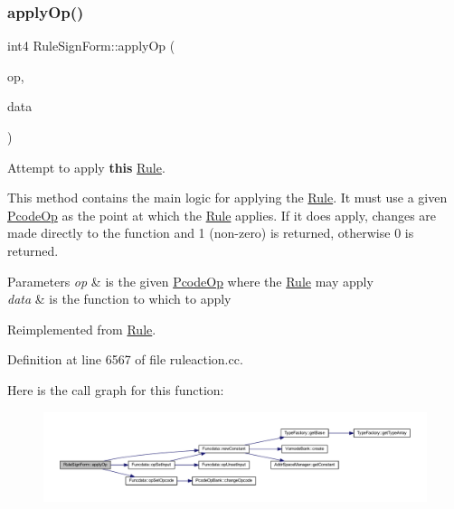 \subsubsection{\texorpdfstring{applyOp()}{applyOp()}}
{\footnotesize\ttfamily int4 Rule\+Sign\+Form\+::apply\+Op (\begin{DoxyParamCaption}\item[{\mbox{\hyperlink{class_pcode_op}{Pcode\+Op}} $\ast$}]{op,  }\item[{\mbox{\hyperlink{class_funcdata}{Funcdata}} \&}]{data }\end{DoxyParamCaption})\hspace{0.3cm}{\ttfamily [virtual]}}



Attempt to apply {\bfseries{this}} \mbox{\hyperlink{class_rule}{Rule}}. 

This method contains the main logic for applying the \mbox{\hyperlink{class_rule}{Rule}}. It must use a given \mbox{\hyperlink{class_pcode_op}{Pcode\+Op}} as the point at which the \mbox{\hyperlink{class_rule}{Rule}} applies. If it does apply, changes are made directly to the function and 1 (non-\/zero) is returned, otherwise 0 is returned. 
\begin{DoxyParams}{Parameters}
{\em op} & is the given \mbox{\hyperlink{class_pcode_op}{Pcode\+Op}} where the \mbox{\hyperlink{class_rule}{Rule}} may apply \\
\hline
{\em data} & is the function to which to apply \\
\hline
\end{DoxyParams}


Reimplemented from \mbox{\hyperlink{class_rule_a4e3e61f066670175009f60fb9dc60848}{Rule}}.



Definition at line 6567 of file ruleaction.\+cc.

Here is the call graph for this function\+:
\nopagebreak
\begin{figure}[H]
\begin{center}
\leavevmode
\includegraphics[width=350pt]{class_rule_sign_form_a4d0250a44bacb1048487280de4ffcd3d_cgraph}
\end{center}
\end{figure}
\mbox{\label{class_rule_sign_form_a41eb49ee67b70035b228b576ad7ab1e4}} 
